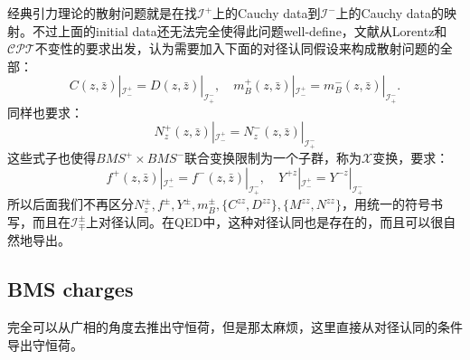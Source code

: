 经典引力理论的散射问题就是在找$\mathcal{I}^+$上的Cauchy data到$\mathcal{I}^-$上的Cauchy data的映射。不过上面的initial data还无法完全使得此问题well-define，文献\cite{Strominger:2013jfa}从Lorentz和${\mathcal{CPT}}$不变性的要求出发，认为需要加入下面的对径认同假设来构成散射问题的全部：
\begin{equation}
	C(z,\bar{z})|_{\mathcal{I}_{-}^{+}}=D(z,\bar{z})|_{\mathcal{I}_{+}^{-}},\quad m^+_{B}(z,\bar{z})|_{\mathcal{I}_{-}^{+}}=m^-_{B}(z,\bar{z})|_{\mathcal{I}_{+}^{-}}.
\end{equation}
同样也要求\cite{Kapec:2014opa}：
\begin{equation}
	N^+_{z}(z,\bar{z})|_{\mathcal{I}_{-}^{+}}=N^-_{z}(z,\bar{z})|_{\mathcal{I}_{+}^{-}}
\end{equation}
这些式子也使得$BMS^+\times BMS^-$联合变换限制为一个子群，称为$\mathcal{X}$变换\cite{Kapec:2014opa}，要求：
\begin{equation}
	f^+(z,\bar z)|_{\mathcal{I}^+_-}=f^-(z,\bar z)|_{\mathcal{I}^-_+},\quad Y^{+z}|_{\mathcal{I}^+_-}=Y^{-z}|_{\mathcal{I}^-_+}
\end{equation}
所以后面我们不再区分$N_z^{\pm},f^{\pm},Y^{\pm},m_B^{\pm},\{C^{zz},D^{zz}\},\{M^{zz},N^{zz}\}$，用统一的符号书写，而且在$\mathcal{I}^{\pm}_{\mp}$上对径认同。在QED中，这种对径认同也是存在的，而且可以很自然地导出。
\subsection{BMS charges}
完全可以从广相的角度去推出守恒荷，但是那太麻烦，这里直接从对径认同的条件导出守恒荷。

